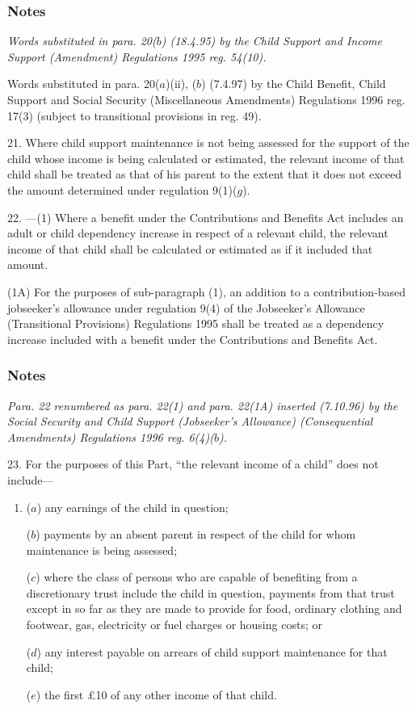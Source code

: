\documentclass[a4paper]{article}
\newcommand\amendment[1]{\subsubsection*{Notes}{\itshape\frenchspacing\footnotesize #1 \par\goodbreak}}
\begin{document}
\amendment{
Words substituted in para. 20($b$) (18.4.95) by the Child Support and Income Support (Amendment) Regulations 1995 reg. 54(10).

Words substituted in para. 20($a$)(ii), ($b$) (7.4.97) by the Child Benefit, Child Support and Social Security (Miscellaneous Amendments) Regulations 1996 reg. 17(3) (subject to transitional provisions in reg. 49).
}

\medskip

21.  Where child support maintenance is not being assessed for the support of the child whose income is being calculated or estimated, the relevant income of that child shall be treated as that of his parent to the extent that it does not exceed the amount determined under regulation 9(1)($g$).

\medskip

22.%
---(1)  %
  Where a benefit under the Contributions and Benefits Act includes an adult or child dependency increase in respect of a relevant child, the relevant income of that child shall be calculated or estimated as if it included that amount.

(1A) For the purposes of sub-paragraph (1), an addition to a contribution-based jobseeker’s allowance under regulation 9(4) of the Jobseeker’s Allowance (Transitional Provisions) Regulations 1995 shall be treated as a dependency increase included with a benefit under the Contributions and Benefits Act.

\amendment{
Para. 22 renumbered as para. 22(1) and para. 22(1A) inserted (7.10.96) by the Social Security and Child Support (Jobseeker's Allowance) (Consequential Amendments) Regulations 1996 reg. 6(4)($b$).
}

\medskip

23.  For the purposes of this Part, “the relevant income of a child” does not include—
\begin{enumerate}\item[]
($a$) any earnings of the child in question;

($b$) payments by an absent parent in respect of the child for whom maintenance is being assessed;

($c$) where the class of persons who are capable of benefiting from a discretionary trust include the child in question, payments from that trust except in so far as they are made to provide for food, ordinary clothing and footwear, gas, electricity or fuel charges or housing costs; or

($d$) any interest payable on arrears of child support maintenance for that child;

($e$) the first £10 of any other income of that child.
\end{enumerate}
\end{document}
